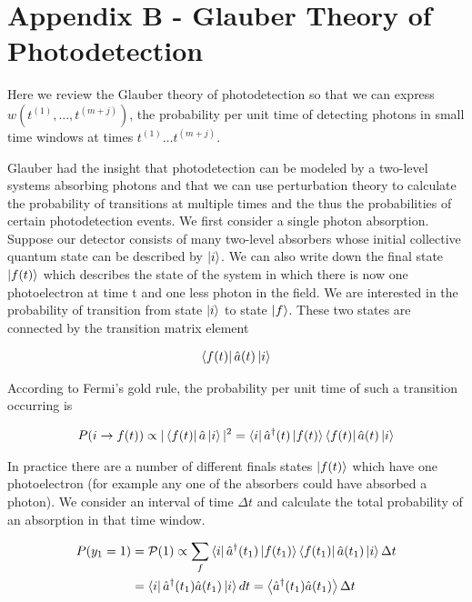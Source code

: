 \documentclass[12pt]{article}
\begin{document}
\section{Appendix B - Glauber Theory of Photodetection}

Here we review the Glauber theory of photodetection so that we can express $w(t^{(1)}, \ldots, t^{(m+j)})$, the probability per unit time of detecting photons in small time windows at times $t^{(1)} \ldots t^{(m+j)}$.

Glauber had the insight that photodetection can be modeled by a two-level systems absorbing photons and that we can use perturbation theory to calculate the probability of transitions at multiple times and the thus the probabilities of certain photodetection events. We first consider a single photon absorption. Suppose our detector consists of many two-level absorbers whose initial collective quantum state can be described by $\ket{i}$. We can also write down the final state $\ket{f(t)}$ which describes the state of the system in which there is now one photoelectron at time t and one less photon in the field. We are interested in the probability of transition from state $\ket{i}$ to state $\ket{f}$. These two states are connected by the transition matrix element

\begin{align}
\bra{f(t)}\hat{a}(t)\ket{i}
\end{align}

According to Fermi's gold rule, the probability per unit time of such a transition occurring is

\begin{align}
P(i \rightarrow f(t)) \propto |\bra{f(t)}\hat{a}\ket{i}|^2 = \bra{i} \hat{a}^{\dag}(t) \ket{f(t)}\bra{f(t)}\hat{a}(t)\ket{i}
\end{align}

In practice there are a number of different finals states $\ket{f(t)}$ which have one photoelectron (for example any one of the absorbers could have absorbed a photon). We consider an interval of time $\Delta t$ and calculate the total probability of an absorption in that time window.

\begin{align}
P(y_{1}=1) &= \mathcal{P}(1) \propto \sum_f \bra{i} \hat{a}^{\dag}(t_{1})\ket{f(t_{1})}\bra{f(t_{1})}\hat{a}(t_{1}) \ket{i}\Delta t\\
&= \bra{i} \hat{a}^{\dag}(t_{1}) \hat{a}(t_{1}) \ket{i}dt = \Braket{\hat{a}^{\dag}(t_1) \hat{a}(t_1)}\Delta t
\end{align}
\end{document}
